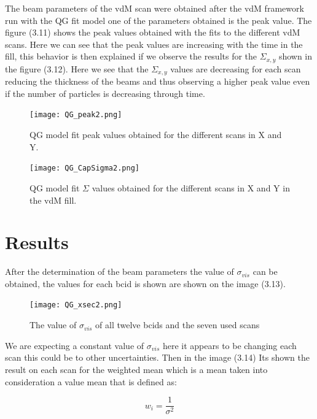 The beam parameters of the vdM scan were obtained after the vdM framework run with the QG fit model one of the parameters obtained is the peak value. The figure (3.11) shows the peak values obtained with the fits to the different vdM scans. Here we can see that the peak values are increasing with the time in the fill, this behavior is then explained if we observe the results for the $\Sigma_{x, y}$ shown in the figure (3.12). Here we see that the $\Sigma_{x, y}$ values are decreasing for each scan reducing the thickness of the beams and thus observing a higher peak value even if the number of particles is decreasing through time. 

\begin{figure}[H]
    \centering
    \texttt{[image: QG\_peak2.png]}
    \caption[Peak values QG fit model.]{QG model fit peak values obtained for the different scans in X and Y.}
    \label{fig:QGpeak}
\end{figure}

\begin{figure}[H]
    \centering
    \texttt{[image: QG\_CapSigma2.png]}
    \caption[$\Sigma$ values QG fit model.]{QG model fit $\Sigma$ values obtained for the different scans in X and Y in the vdM fill.}
    \label{fig:QGcapsigma}
\end{figure}

\section{Results}

After the determination of the beam parameters  the value of $\sigma_{vis}$ can be obtained, the values for each bcid is shown are shown on the image (3.13).

\begin{figure}[H]
    \centering
    \texttt{[image: QG\_xsec2.png]}
    \caption{The value of $\sigma_{vis}$ of all twelve bcids and the seven used scans}
    \label{fig:sigbcid}
\end{figure}

We are expecting a constant value of $\sigma_{vis}$ here it appears to be changing each scan this could be to other uncertainties. Then in the image (3.14) Its shown the result on each scan for the weighted mean which is a mean taken into consideration a value mean that is defined as:

\begin{equation}
w_{i}=\frac{1}{\sigma^{2}}
\end{equation}

